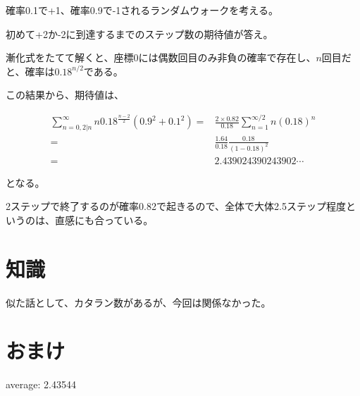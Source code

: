 \documentclass[a4paper, 10pt, dvipdfmx]{jlreq}
\begin{document}
確率0.1で+1、確率0.9で-1されるランダムウォークを考える。

初めて+2か-2に到達するまでのステップ数の期待値が答え。

漸化式をたてて解くと、座標0には偶数回目のみ非負の確率で存在し、$n$回目だと、確率は$0.18^{n/2}$である。

この結果から、期待値は、

\begin{align*}
  \sum_{n=0,2|n}^{\infty}n 0.18^{\frac{n-2}{2}} (0.9^2+0.1^2) ={} & \frac{2\times 0.82}{0.18}\sum_{n=1}^{\infty/2}n(0.18)^n \\
  ={}                                                             & \frac{1.64}{0.18}\frac{0.18}{(1-0.18)^2}                \\
  ={}                                                             & 2.439024390243902\cdots
\end{align*}

となる。

2ステップで終了するのが確率0.82で起きるので、全体で大体2.5ステップ程度というのは、直感にも合っている。

\section{知識}

似た話として、カタラン数があるが、今回は関係なかった。

\section{おまけ}



average: 2.43544
\end{document}
